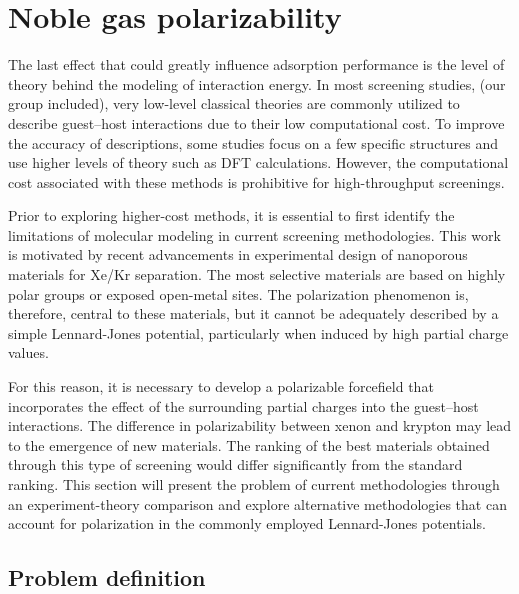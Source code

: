 \documentclass[main]{subfiles}
\begin{document}
\section{Noble gas polarizability}

The last effect that could greatly influence adsorption performance is the level of theory behind the modeling of interaction energy. In most screening studies, (our group included), very low-level classical theories are commonly utilized to describe guest--host interactions due to their low computational cost. To improve the accuracy of descriptions, some studies focus on a few specific structures and use higher levels of theory such as DFT calculations. However, the computational cost associated with these methods is prohibitive for high-throughput screenings.

Prior to exploring higher-cost methods, it is essential to first identify the limitations of molecular modeling in current screening methodologies. This work is motivated by recent advancements in experimental design of nanoporous materials for Xe/Kr separation. The most selective materials are based on highly polar groups or exposed open-metal sites.\autocite{Li_2019,Pei_2022} The polarization phenomenon is, therefore, central to these materials, but it cannot be adequately described by a simple Lennard-Jones potential, particularly when induced by high partial charge values.

For this reason, it is necessary to develop a polarizable forcefield that incorporates the effect of the surrounding partial charges into the guest--host interactions. The difference in polarizability between xenon and krypton may lead to the emergence of new materials. The ranking of the best materials obtained through this type of screening would differ significantly from the standard ranking. This section will present the problem of current methodologies through an experiment-theory comparison and explore alternative methodologies that can account for polarization in the commonly employed Lennard-Jones potentials.

\subsection{Problem definition}
\end{document}
